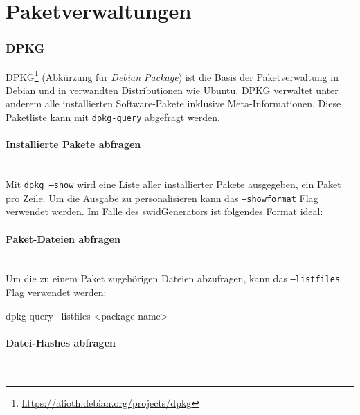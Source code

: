 \section{Paketverwaltungen}


\subsubsection{DPKG}

DPKG\footnote{\url{https://alioth.debian.org/projects/dpkg}} (Abkürzung für
\textit{Debian Package}) ist die Basis der Paketverwaltung in Debian und in
verwandten Distributionen wie Ubuntu. DPKG verwaltet unter anderem alle
installierten Software-Pakete inklusive Meta-Informationen. Diese Paketliste
kann mit \texttt{dpkg-query} abgefragt werden.

\paragraph{Installierte Pakete abfragen} \hspace{0pt} \\

\noindent Mit \texttt{dpkg ---show} wird eine Liste aller installierter Pakete
ausgegeben, ein Paket pro Zeile. Um die Ausgabe zu personalisieren kann das
\texttt{---showformat} Flag verwendet werden. Im Falle des swidGenerators
ist folgendes Format ideal:


\paragraph{Paket-Dateien abfragen} \hspace{0pt} \\

\noindent Um die zu einem Paket zugehörigen Dateien abzufragen, kann das
\texttt{---listfiles} Flag verwendet werden:

\begin{bashcode}
dpkg-query --listfiles <package-name>
\end{bashcode}

\paragraph{Datei-Hashes abfragen} \hspace{0pt} \\


